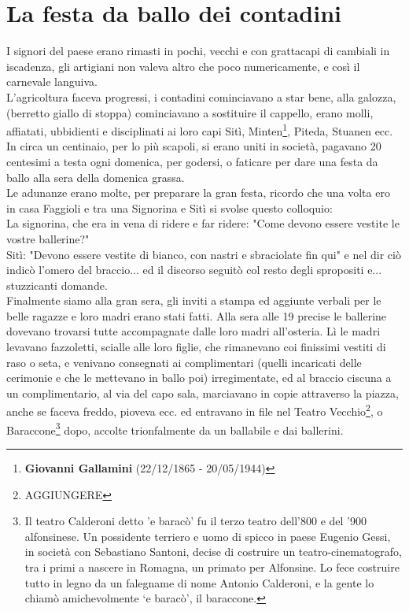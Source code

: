 
\chapter{La festa da ballo dei contadini}
I signori del paese erano rimasti in pochi, vecchi e con grattacapi di cambiali in iscadenza, gli artigiani non valeva altro che poco numericamente, e così il carnevale languiva. \\
L'agricoltura faceva progressi, i contadini cominciavano a star bene, alla galozza, (berretto giallo di stoppa) cominciavano a sostituire il cappello, erano molli, affiatati, ubbidienti e disciplinati ai loro capi Sitì, Minten\footnote{\textbf{Giovanni Gallamini} (22/12/1865 - 20/05/1944)}, Piteda, Stuanen ecc.\\
In circa un centinaio, per lo più scapoli, si erano uniti in società, pagavano 20 centesimi a testa ogni domenica, per godersi, o faticare per dare una festa da ballo alla sera della domenica grassa. \\
Le adunanze erano molte, per preparare la gran festa, ricordo che una volta ero in casa Faggioli e tra una Signorina e Sitì si svolse questo colloquio:\\
La signorina, che era in vena di ridere e far ridere: "Come devono essere vestite le vostre ballerine?"\\
Sitì: "Devono essere vestite di bianco, con nastri e sbraciolate fin qui" e nel dir ciò indicò l'omero del braccio... ed il discorso seguitò col resto degli spropositi e... stuzzicanti domande.\\
Finalmente siamo alla gran sera, gli inviti a stampa ed aggiunte verbali per le belle ragazze e loro madri erano stati fatti. Alla sera alle 19 precise le ballerine dovevano trovarsi tutte accompagnate dalle loro madri all'osteria. Lì le madri levavano fazzoletti, scialle alle loro figlie, che rimanevano coi finissimi vestiti di raso o seta, e venivano consegnati ai complimentari (quelli incaricati delle cerimonie e che le mettevano in ballo poi) irregimentate, ed al braccio ciscuna a un complimentario, al via del capo sala, marciavano in copie attraverso la piazza, anche se faceva freddo, pioveva ecc. ed entravano in file nel Teatro Vecchio\footnote{AGGIUNGERE}, o Baraccone\footnote{Il teatro Calderoni detto 'e baracò' fu il terzo teatro dell'800 e del '900 alfonsinese. Un possidente terriero e uomo di spicco in paese Eugenio Gessi, in società con Sebastiano Santoni, decise di costruire un teatro-cinematografo, tra i primi a nascere in Romagna, un primato per Alfonsine. Lo fece costruire tutto in legno da un falegname di nome Antonio Calderoni, e la gente lo chiamò amichevolmente ‘e baracò', il baraccone.} dopo, accolte trionfalmente da un ballabile e dai ballerini.\\
